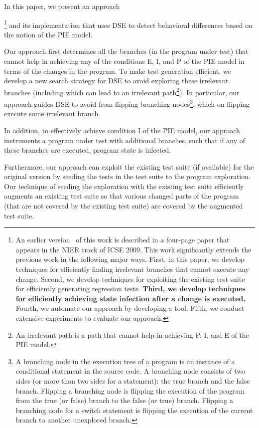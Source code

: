 In this paper, we present an approach{\footnote{\scriptsize{An earlier version~\cite{taneja09:guided} of this work is described in a four-page paper that appears in the NIER track of ICSE 2009. This
work significantly extends the previous work in the following major ways.
First, in this paper, we develop techniques for efficiently finding irrelevant branches 
that cannot execute any change. 
Second, we develop techniques for exploiting the existing test suite for efficiently generating regression tests.
\textbf{Third, we develop techniques for efficiently achieving state infection after a change is executed.}
Fourth, we automate our approach by developing a tool.
Fifth, we conduct extensive experiments to evaluate our approach.}}  and its implementation that uses DSE to detect behavioral differences based on the notion of the PIE model.

Our approach first determines all the branches (in the program under test) that cannot help in achieving any of the conditions E, I, and P of the PIE model in terms of the changes in the program. To make test generation efficient, we develop a new search strategy for DSE to avoid exploring these irrelevant branches (including which can lead to an irrelevant path\footnote{\scriptsize{An irrelevant path is a path that cannot help in achieving P, I, and E of the PIE model.}}). In particular, our approach guides DSE to avoid from flipping branching nodes\footnote{\scriptsize{A branching node in the execution tree of a program is an instance of a conditional statement in the source code. A branching node consists of two sides (or more than two sides for a  statement): the true branch and the false branch. Flipping a branching node is flipping the execution of the program from the true (or false) branch to the false (or true) branch. Flipping a branching node for a switch statement is flipping the execution of the current branch to another unexplored branch.}}, which on flipping execute some irrelevant branch. 


In addition, to effectively achieve condition I of the PIE model, our approach instruments a program under test with additional branches, 
such that if any of these branches are executed, program state is infected. 

Furthermore, our approach can exploit the existing test suite (if available) for the original version by seeding the tests in the test suite to the program exploration. Our technique of seeding the exploration with the existing test suite efficiently augments an existing test suite so that various changed parts of the program (that are not covered by the existing test suite) are covered by the augmented test suite. 

}
